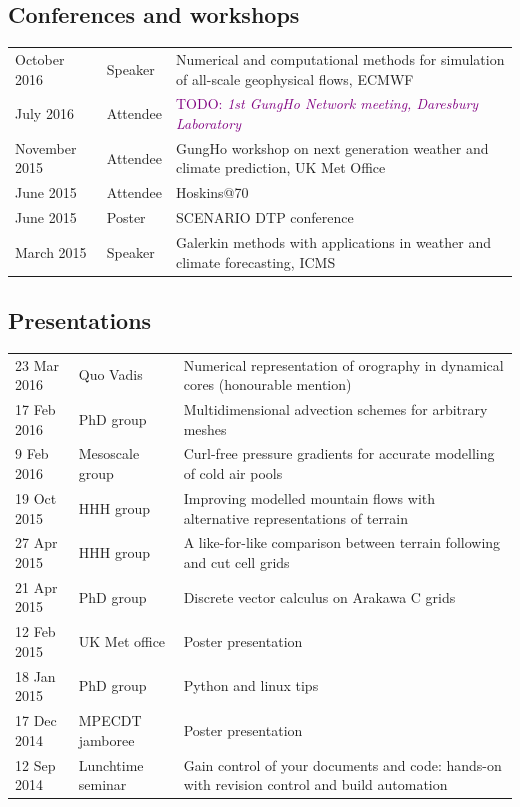 \documentclass[a4paper,11pt]{article}
\newcommand{\TODO}[1]{\textcolor{purple}{TODO: \emph{#1}}}
\begin{document}
{\subsection*{Conferences and workshops}
\begin{tabularx}{\linewidth}{l l X}
October 2016 & Speaker & Numerical and computational methods for simulation of all-scale geophysical flows, ECMWF \\
July 2016 & Attendee & \TODO{1st GungHo Network meeting, Daresbury Laboratory} \\
November 2015 & Attendee & GungHo workshop on next generation weather and climate prediction, UK Met Office \\
June 2015 & Attendee & Hoskins@70 \\
June 2015 & Poster & SCENARIO DTP conference \\
March 2015 & Speaker & Galerkin methods with applications in weather and climate forecasting, ICMS \\
\end{tabularx}

\subsection*{Presentations}
\begin{tabularx}{\linewidth}{l l X}
23 Mar 2016 & Quo Vadis & Numerical representation of orography in dynamical cores (honourable mention) \\
17 Feb 2016 & PhD group & Multidimensional advection schemes for arbitrary meshes \\
9 Feb 2016 & Mesoscale group & Curl-free pressure gradients for accurate modelling of cold air pools \\
19 Oct 2015 & HHH group & Improving modelled mountain flows with alternative representations of terrain \\
27 Apr 2015 & HHH group & A like-for-like comparison between terrain following and cut cell grids \\
21 Apr 2015 & PhD group & Discrete vector calculus on Arakawa C grids \\
12 Feb 2015 & UK Met office & Poster presentation \\
18 Jan 2015 & PhD group & Python and linux tips \\
17 Dec 2014 & MPECDT jamboree & Poster presentation \\
12 Sep 2014 & Lunchtime seminar  & Gain control of your documents and code: hands-on with revision control and build automation \\
\end{tabularx}

}
\end{document}
